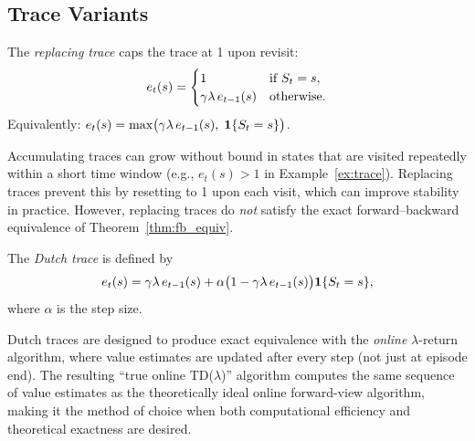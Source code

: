\documentclass[11pt,a4paper]{article}
\begin{document}
\subsection{Trace Variants}
\label{subsec:trace_variants}

\begin{definition}
\label{def:replacing}
The \emph{replacing trace} caps the trace at 1 upon revisit:
\begin{equation}
  e_t(s) = \begin{cases}
    1 & \text{if } S_t = s, \\
    \gamma\lambda\,e_{t-1}(s) & \text{otherwise.}
  \end{cases}
  \label{eq:replacing}
\end{equation}
Equivalently:
$e_t(s) = \max\bigl(\gamma\lambda\,e_{t-1}(s),\;
\mathbf{1}\{S_t = s\}\bigr)$.
\end{definition}

\begin{remark}
\label{rem:replacing}
Accumulating traces can grow without bound in states that are visited
repeatedly within a short time window (e.g., $e_t(s) > 1$ in
Example~\ref{ex:trace}). Replacing traces prevent this by resetting
to 1 upon each visit, which can improve stability in practice.
However, replacing traces do \emph{not} satisfy the exact
forward--backward equivalence of Theorem~\ref{thm:fb_equiv}.
\end{remark}

\begin{definition}
\label{def:dutch}
The \emph{Dutch trace} is defined by
\begin{equation}
  e_t(s) = \gamma\lambda\,e_{t-1}(s)
  + \alpha\bigl(1 - \gamma\lambda\,e_{t-1}(s)\bigr)
    \mathbf{1}\{S_t = s\},
  \label{eq:dutch}
\end{equation}
where $\alpha$ is the step size.
\end{definition}

\begin{remark}
\label{rem:true_online}
Dutch traces are designed to produce exact equivalence with the
\emph{online} $\lambda$-return algorithm, where value estimates are
updated after every step (not just at episode end). The resulting
``true online TD($\lambda$)'' algorithm
\citep[Chapter 12]{suttonbarto2018} computes the same sequence of
value estimates as the theoretically ideal online forward-view
algorithm, making it the method of choice when both computational
efficiency and theoretical exactness are desired.
\end{remark}
\end{document}
